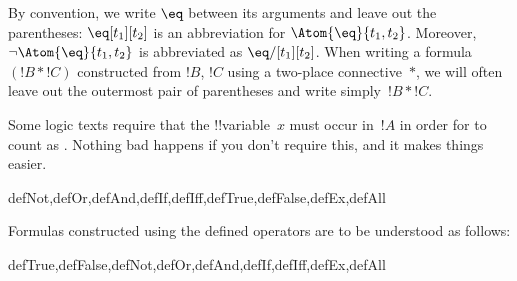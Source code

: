 \documentclass[../../../include/open-logic-section]{subfiles}
\begin{document}
By convention, we write $\eq$ between its arguments and leave out the
parentheses: $\eq[t_1][t_2]$ is an abbreviation for
$\Atom{\eq}{t_1,t_2}$.  Moreover, $\lnot \Atom{\eq}{t_1,t_2}$ is
abbreviated as $\eq/[t_1][t_2]$. When writing a formula $(!B \ast !C)$
constructed from $!B$, $!C$ using a two-place connective~$\ast$, we
will often leave out the outermost pair of parentheses and write
simply~$!B \ast !C$.

\begin{intro}
Some logic texts require that the !!{variable}~$x$ must occur in~$!A$
in order for
%
%
%
to count as
.
Nothing bad happens if you don't require this, and it makes things
easier.
\end{intro}

\begin{tagblock}{defNot,defOr,defAnd,defIf,defIff,defTrue,defFalse,defEx,defAll}
\begin{defn}
Formulas constructed using the defined operators are to be understood
as follows:

\begin{tagenumerate}{defTrue,defFalse,defNot,defOr,defAnd,defIf,defIff,defEx,defAll}









\end{tagenumerate}
\end{defn}
\end{tagblock}
\end{document}
